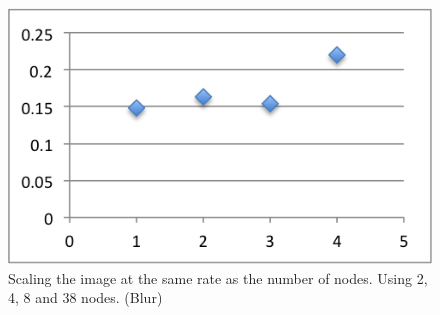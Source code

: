 \documentclass[a4paper]{article}
\begin{document}
\begin{figure}[h]
  \centering
  \includegraphics{sameDiffBlur.png}
  \caption{Scaling the image at the same rate as the number of nodes. Using 2, 4, 8 and 38 nodes. (Blur)}
  \label{fig:fig6}
\end{figure}
\end{document}
